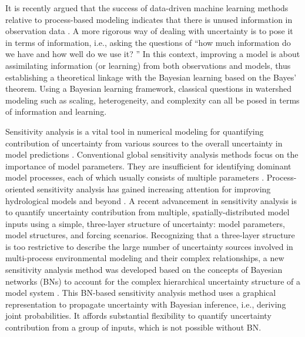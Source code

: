 \documentclass[preprint,review, 12pt]{elsarticle}
\begin{document}
It is recently argued that the success of data-driven machine learning methods relative to process-based modeling indicates that there is unused information in observation data \citep{Nearing2018c}. A more rigorous way of dealing with uncertainty is to pose it in terms of information, i.e., asking the questions of “how much information do we have and how well do we use it? \citep{Nearing2018c}” In this context, improving a model is about assimilating information (or learning) from both observations and models, thus establishing a theoretical linkage with the Bayesian learning based on the Bayes’ theorem. Using a Bayesian learning framework, classical questions in watershed modeling such as scaling, heterogeneity, and complexity can all be posed in terms of information and learning. 

Sensitivity analysis is a vital tool in numerical modeling for quantifying contribution of uncertainty from various sources to the overall uncertainty in model predictions \citep{Dai2017a, Dai2017, Razavi2015, Gupta2018}. Conventional global sensitivity analysis methods \citep{Saltelli2000, Chu-Agor2011, Song2015b} focus on the importance of model parameters. They are insufficient for identifying dominant model processes, each of which usually consists of multiple parameters \citep{Clark2015d, Clark2015a}. Process-oriented sensitivity analysis has gained increasing attention for improving hydrological models and beyond \citep{Dai2017, Sivakumar2004e, Sivakumar2008b}. A recent advancement in sensitivity analysis is to quantify uncertainty contribution from multiple, spatially-distributed model inputs using a simple, three-layer structure of uncertainty: model parameters, model structures, and forcing scenarios. Recognizing that a three-layer structure is too restrictive to describe the large number of uncertainty sources involved in multi-process environmental modeling and their complex relationships, a new sensitivity analysis method was developed based on the concepts of Bayesian networks (BNs) \citep{Heckerman1997c, Velikova2014, Pearl1988} to account for the complex hierarchical uncertainty structure of a model system \citep{Dai2019}. This BN-based sensitivity analysis method uses a graphical representation to propagate uncertainty with Bayesian inference, i.e., deriving joint probabilities. It affords substantial flexibility to quantify uncertainty contribution from a group of inputs, which is not possible without BN. 
\end{document}

